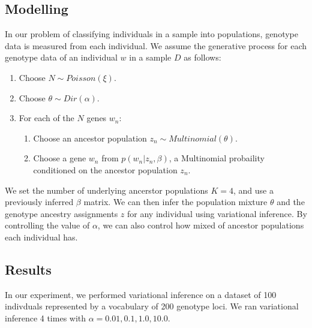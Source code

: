\documentclass[a4paper]{article}
\begin{document}
	\subsection{Modelling}

	In our problem of classifying individuals in a sample into populations,
	genotype data is measured from each individual.
	We assume the generative process for each genotype data of an individual $w$ in a sample $D$ as follows:
	\begin{enumerate}
		\item Choose $N\sim Poisson(\xi)$.
		\item Choose $\theta \sim Dir(\alpha)$.
		\item For each of the $N$ genes $w_n$:
		\begin{enumerate}
			\item Choose an ancestor population $z_n \sim Multinomial(\theta)$.
			\item Choose a gene $w_n$ from $p(w_n|z_n,\beta)$, a Multinomial probaility conditioned on the ancestor population $z_n$.
		\end{enumerate}
	\end{enumerate}

	We set the number of underlying ancerstor populations $K = 4$, and use a previously inferred $\beta$ matrix.
	We can then infer the population mixture $\theta$ and the genotype ancestry assignments $z$ for any individual using variational inference.
	By controlling the value of $\alpha$, we can also control how mixed of ancestor populations each individual has.

	\subsection{Results}
	In our experiment, we performed variational inference on a dataset of 100 indivduals represented by a vocabulary of 200 genotype loci.
	We ran variational inference 4 times with $\alpha = 0.01, 0.1, 1.0, 10.0$.
\end{document}
